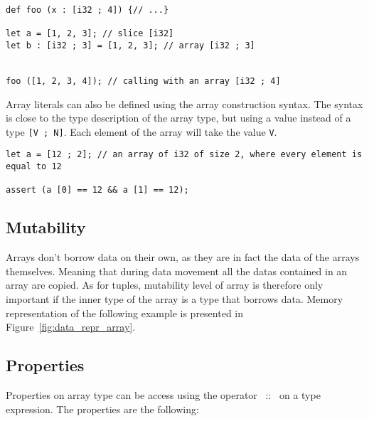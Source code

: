 \begin{lstlisting}[style=coloredverbatim]
def foo (x : [i32 ; 4]) {// ...}

let a = [1, 2, 3]; // slice [i32]
let b : [i32 ; 3] = [1, 2, 3]; // array [i32 ; 3]


foo ([1, 2, 3, 4]); // calling with an array [i32 ; 4]
\end{lstlisting}

Array literals can also be defined using the array construction syntax. The
syntax is close to the type description of the array type, but using a value
instead of a type \texttt{[V ; N]}. Each element of the array will take the
value \texttt{V}.

\begin{lstlisting}[style=coloredverbatim]
let a = [12 ; 2]; // an array of i32 of size 2, where every element is equal to 12

assert (a [0] == 12 && a [1] == 12);
\end{lstlisting}

\subsection {Mutability}

Arrays don't borrow data on their own, as they are in fact the data of the
arrays themselves. Meaning that during data movement all the datas contained in
an array are copied. As for tuples, mutability level of array is therefore only
important if the inner type of the array is a type that borrows data. Memory
representation of the following example is presented in
Figure~\ref{fig:data_repr_array}.



\subsection {Properties}

Properties on array type can be access using the operator ~::~ on a type
expression. The properties are the following:

